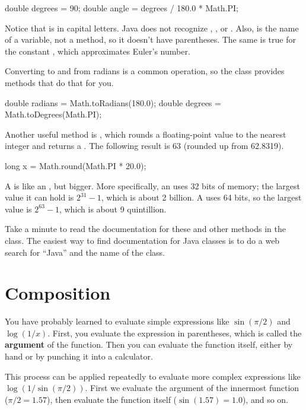 \begin{code}
double degrees = 90;
double angle = degrees / 180.0 * Math.PI;
\end{code}

Notice that  is in capital letters.
Java does not recognize , , or .
Also,  is the name of a variable, not a method, so it doesn't have parentheses.
The same is true for the constant , which approximates Euler's number.

Converting to and from radians is a common operation, so the  class provides methods that do that for you.

\begin{code}
double radians = Math.toRadians(180.0);
double degrees = Math.toDegrees(Math.PI);
\end{code}


Another useful method is , which rounds a floating-point value to the nearest integer and returns a .
The following result is 63 (rounded up from 62.8319).

\begin{code}
long x = Math.round(Math.PI * 20.0);
\end{code}

A  is like an , but bigger.
More specifically, an  uses 32 bits of memory; the largest value it can hold is $2^{31}-1$, which is about 2 billion.
A  uses 64 bits, so the largest value is $2^{63}-1$, which is about 9 quintillion.

Take a minute to read the documentation for these and other methods in the  class.
The easiest way to find documentation for Java classes is to do a web search for ``Java'' and the name of the class.


\section{Composition}


You have probably learned to evaluate simple expressions like $\sin(\pi/2)$ and $\log(1/x)$.
First, you evaluate the expression in parentheses, which is called the {\bf argument} of the function.
Then you can evaluate the function itself, either by hand or by punching it into a calculator.

This process can be applied repeatedly to evaluate more complex expressions like $\log(1/\sin(\pi/2))$.
First we evaluate the argument of the innermost function ($\pi/2 = 1.57$), then evaluate the function itself ($\sin(1.57) = 1.0$), and so on.

